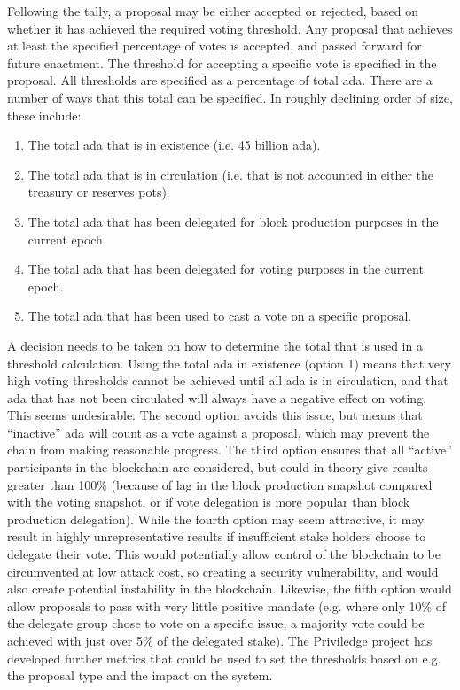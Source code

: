 Following the tally, a proposal may be either accepted or rejected, based on whether it has achieved the required voting threshold.  Any proposal that achieves at least
the specified percentage of votes is accepted, and passed forward for future enactment.
The threshold for accepting a specific vote is specified in the proposal.
All thresholds are specified as a percentage of total ada.  There are a number of ways that this total can be specified.  In roughly declining order of size, these include:

\begin{enumerate}
\item
  The total ada that is in existence (i.e. 45 billion ada).
\item
  The total ada that is in circulation (i.e. that is not accounted in either the treasury or reserves pots).
\item
  The total ada that has been delegated for block production purposes in the current epoch.
\item
  The total ada that has been delegated for voting purposes in the current epoch.
\item
  The total ada that has been used to cast a vote on a specific proposal.
\end{enumerate}

A decision needs to be taken on how to determine the total that is used in a threshold calculation.
Using the total ada in existence (option 1) means that very high voting thresholds cannot be achieved until all ada
is in circulation, and that ada that has not been circulated will always have a negative effect on voting.
This seems undesirable.
The second option avoids this issue, but means that ``inactive'' ada will count as a vote against a proposal, which may prevent the chain from making reasonable progress.
The third option ensures that all ``active'' participants in the blockchain are considered, but could in theory give results greater than 100\% (because of lag in the
block production snapshot compared with the voting snapshot, or if vote delegation is more popular than block production delegation).
While the fourth option may seem attractive, it may result in highly unrepresentative results if insufficient stake holders choose to delegate their vote.  This would potentially allow control of the
blockchain to be circumvented at low attack cost, so creating a security vulnerability, and would also create potential instability in the blockchain.
Likewise, the fifth option would allow proposals to pass with very little positive mandate (e.g. where only 10\% of the delegate group chose to vote on a specific issue, a majority vote could be
achieved with just over 5\% of the delegated stake).
The Priviledge project has developed further metrics that could be used to set the thresholds based on e.g. the proposal type and the
impact on the system.

